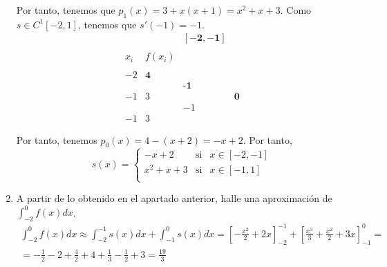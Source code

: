 \begin{ejercicio}
\begin{enumerate}
        Por tanto, tenemos que $p_1(x)=3+x(x+1)=x^2+x+3$. Como $s\in C^1[-2,1]$, tenemos que $s'(-1)=-1$.
        \begin{equation*}
            \begin{array}{c|ccc}
                &&\mathbf{[-2, -1]} \\ \\
                x_i & f(x_i) \\ \\
                -2 & \textbf{4} \\
                && \textbf{-1} \\ 
                -1 & 3 && \textbf{0}\\
                && -1\\
                -1 & 3
            \end{array}
        \end{equation*}

        Por tanto, tenemos $p_0(x)=4-(x+2)=-x+2$. Por tanto,
        \begin{equation*}
            s(x)=\left\{\begin{array}{lll}
                -x+2 & \text{si} & x\in [-2, -1]\\
                x^2+x+3 & \text{si} & x\in [-1, 1]\\
            \end{array} \right.
        \end{equation*}

        \item A partir de lo obtenido en el apartado anterior, halle una aproximación de $\displaystyle \int_{-2}^0 f(x)dx$.
        \begin{multline*}
            \int_{-2}^0 f(x)dx \approx \int_{-2}^{-1} s(x)dx + \int_{-1}^0 s(x)dx = \left[-\frac{x^2}{2}+2x\right]^{-1}_{-2} + \left[\frac{x^3}{3}+\frac{x^2}{2}+3x\right]^{0}_{-1} 
            =\\=
            -\frac{1}{2}-2+\frac{4}{2}+4 +\frac{1}{3}-\frac{1}{2}+3 = \frac{19}{3}
        \end{multline*}
    \end{enumerate}
\end{ejercicio}

